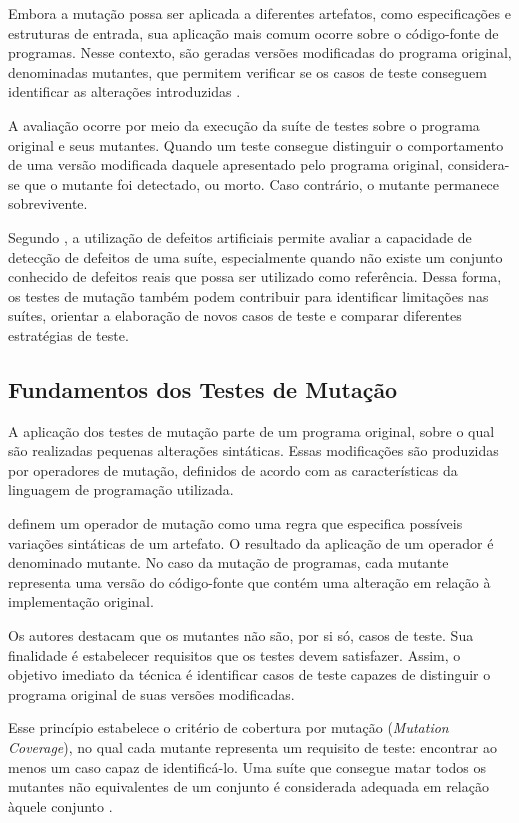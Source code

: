 Embora a mutação possa ser aplicada a diferentes artefatos, como especificações e estruturas de entrada, sua aplicação mais comum ocorre sobre o código-fonte de programas. Nesse contexto, são geradas versões modificadas do programa original, denominadas mutantes, que permitem verificar se os casos de teste conseguem identificar as alterações introduzidas \cite{ammann2016}.

A avaliação ocorre por meio da execução da suíte de testes sobre o programa original e seus mutantes. Quando um teste consegue distinguir o comportamento de uma versão modificada daquele apresentado pelo programa original, considera-se que o mutante foi detectado, ou morto. Caso contrário, o mutante permanece sobrevivente.

Segundo , a utilização de defeitos artificiais permite avaliar a capacidade de detecção de defeitos de uma suíte, especialmente quando não existe um conjunto conhecido de defeitos reais que possa ser utilizado como referência. Dessa forma, os testes de mutação também podem contribuir para identificar limitações nas suítes, orientar a elaboração de novos casos de teste e comparar diferentes estratégias de teste.

\subsection{Fundamentos dos Testes de Mutação}

A aplicação dos testes de mutação parte de um programa original, sobre o qual são realizadas pequenas alterações sintáticas. Essas modificações são produzidas por operadores de mutação, definidos de acordo com as características da linguagem de programação utilizada.

 definem um operador de mutação como uma regra que especifica possíveis variações sintáticas de um artefato. O resultado da aplicação de um operador é denominado mutante. No caso da mutação de programas, cada mutante representa uma versão do código-fonte que contém uma alteração em relação à implementação original.

Os autores destacam que os mutantes não são, por si só, casos de teste. Sua finalidade é estabelecer requisitos que os testes devem satisfazer. Assim, o objetivo imediato da técnica é identificar casos de teste capazes de distinguir o programa original de suas versões modificadas.

Esse princípio estabelece o critério de cobertura por mutação (\textit{Mutation Coverage}), no qual cada mutante representa um requisito de teste: encontrar ao menos um caso capaz de identificá-lo. Uma suíte que consegue matar todos os mutantes não equivalentes de um conjunto é considerada adequada em relação àquele conjunto \cite{ammann2016}.

